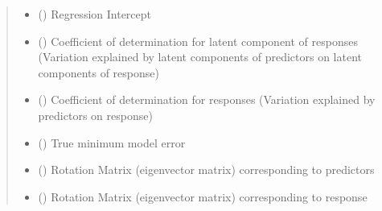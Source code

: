 \documentclass[letterpaper,10pt,english]{sphinxmanual}
\begin{document}
\begin{fulllineitems}
\begin{quote}
\begin{description}
\begin{itemize}
\item {} 
\sphinxAtStartPar
{} () \textendash{} Regression Intercept

\item {} 
\sphinxAtStartPar
{} () \textendash{} Coefficient of determination for latent component of responses (Variation explained by latent components of predictors on latent components of response)

\item {} 
\sphinxAtStartPar
{} () \textendash{} Coefficient of determination for responses (Variation explained by predictors on response)

\item {} 
\sphinxAtStartPar
{} () \textendash{} True minimum model error

\item {} 
\sphinxAtStartPar
{} () \textendash{} Rotation Matrix (eigenvector matrix) corresponding to predictors

\item {} 
\sphinxAtStartPar
{} () \textendash{} Rotation Matrix (eigenvector matrix) corresponding to response

\end{itemize}

\end{description}\end{quote}

\end{fulllineitems}


\begin{fulllineitems}
\label{\detokenize{Classes:pysimrel.Data}}
\pysigstartsignatures
{}
\pysigstopsignatures
\end{fulllineitems}
\end{document}
